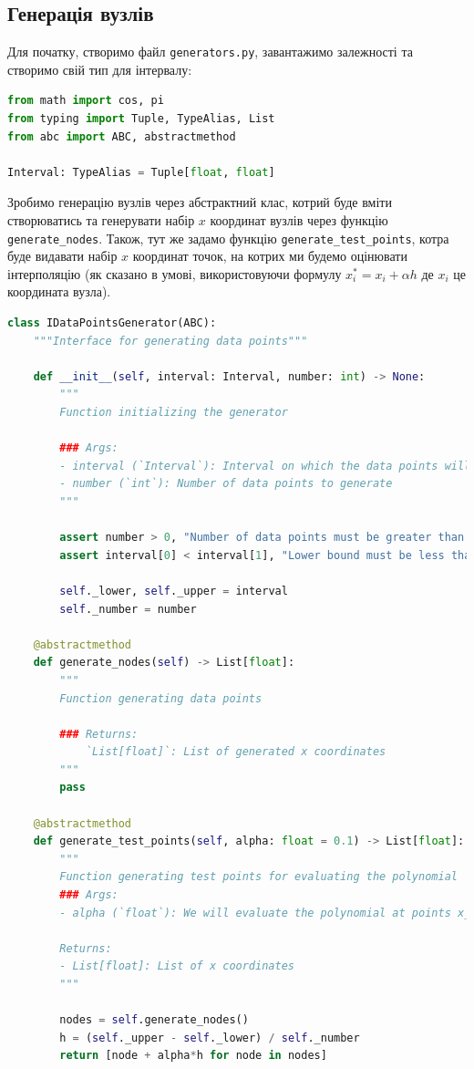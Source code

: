 \documentclass[12pt]{extarticle}
\begin{document}
\subsection{Генерація вузлів}

Для початку, створимо файл \texttt{generators.py}, завантажимо залежності та створимо свій тип для інтервалу:

\begin{lstlisting}[language=Python, caption=Завантаження залежностей]
from math import cos, pi
from typing import Tuple, TypeAlias, List
from abc import ABC, abstractmethod

Interval: TypeAlias = Tuple[float, float]
\end{lstlisting}

Зробимо генерацію вузлів через абстрактний клас, котрий буде вміти створюватись та генерувати набір $x$ координат вузлів через функцію \texttt{generate\_nodes}. Також, тут же задамо функцію \texttt{generate\_test\_points}, котра буде видавати набір $x$ координат точок, на котрих ми будемо оцінювати інтерполяцію (як сказано в умові, використовуючи формулу $x_i^* = x_i+\alpha h$ де $x_i$ це координата вузла).

\begin{lstlisting}[language=Python, caption=Задання абстрактного класу]
class IDataPointsGenerator(ABC):
    """Interface for generating data points"""
    
    def __init__(self, interval: Interval, number: int) -> None:
        """
        Function initializing the generator

        ### Args:
        - interval (`Interval`): Interval on which the data points will be generated
        - number (`int`): Number of data points to generate
        """
        
        assert number > 0, "Number of data points must be greater than 0"
        assert interval[0] < interval[1], "Lower bound must be less than upper bound"
        
        self._lower, self._upper = interval
        self._number = number
    
    @abstractmethod
    def generate_nodes(self) -> List[float]:
        """
        Function generating data points

        ### Returns:
            `List[float]`: List of generated x coordinates
        """
        pass
    
    @abstractmethod
    def generate_test_points(self, alpha: float = 0.1) -> List[float]:
        """
        Function generating test points for evaluating the polynomial
        ### Args:
        - alpha (`float`): We will evaluate the polynomial at points x_i + alpha*h

        Returns:
        - List[float]: List of x coordinates
        """
        
        nodes = self.generate_nodes()
        h = (self._upper - self._lower) / self._number
        return [node + alpha*h for node in nodes]
\end{lstlisting}
\end{document}
